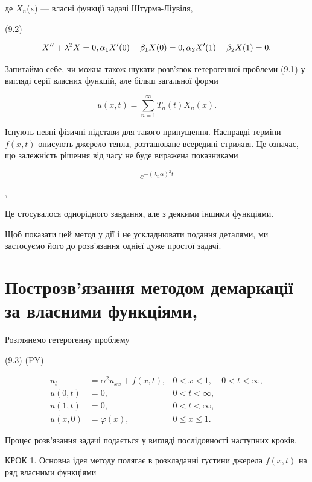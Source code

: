 \documentclass[
  ukrainian,
]{article}
\begin{document}
де \(X_n\)(x) --- власні функції задачі Штурма-Ліувіля,

(9.2)

\[
X'' + \lambda^2 X = 0, \\ \alpha_1 X'(0) + \beta_1 X(0) = 0, \\ \alpha_2 X'(1) + \beta_2 X(1) = 0.
\]

Запитаймо себе, чи можна також шукати розв'язок гетерогенної проблеми
(9.1) у вигляді серії власних функцій, але більш загальної форми

\[
u(x, t) = \sum_{n=1}^{\infty} T_n(t) X_n(x).
\]

Існують певні фізичні підстави для такого припущення. Насправді терміни
\(f(x,t)\) описують джерело тепла, розташоване всередині стрижня. Це
означає, що залежність рішення від часу не буде виражена показниками

\[
e^{-(\lambda_n\alpha)^2 t}
\]

,

Це стосувалося однорідного завдання, але з деякими іншими функціями.

Щоб показати цей метод у дії і не ускладнювати подання деталями, ми
застосуємо його до розв'язання однієї дуже простої задачі.

\section{Построзв'язання методом демаркації за власними
функціями,}\label{ux43fux43eux441ux442ux440ux43eux437ux432ux44fux437ux430ux43dux43dux44f-ux43cux435ux442ux43eux434ux43eux43c-ux434ux435ux43cux430ux440ux43aux430ux446ux456ux457-ux437ux430-ux432ux43bux430ux441ux43dux438ux43cux438-ux444ux443ux43dux43aux446ux456ux44fux43cux438}

Розглянемо гетерогенну проблему

(9.3) (PY)

\[
\begin{aligned} u_t &= \alpha^2 u_{xx} + f(x, t), & 0 < x < 1, & 0 < t < \infty, \\ u(0, t) &= 0, & 0 < t < \infty, \\ u(1, t) &= 0, & 0 < t < \infty, \\ u(x, 0) &= \varphi(x), & 0 \leqslant x \leqslant 1. \end{aligned}
\]

Процес розв'язання задачі подається у вигляді послідовності наступних
кроків.

КРОК 1. Основна ідея методу полягає в розкладанні густини джерела
\(f(x, t)\) на ряд власними функціями
\end{document}
